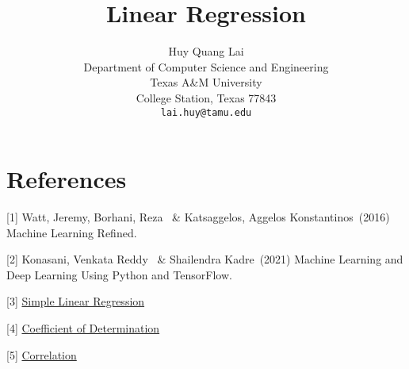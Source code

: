 \documentclass{article}
\title{Linear Regression}
\author{
    Huy Quang Lai \\
    Department of Computer Science and Engineering\\
    Texas A\&M University\\
    College Station, Texas 77843 \\
    \texttt{lai.huy@tamu.edu} \\
}
\begin{document}
\maketitle




\clearpage







\section*{References}
{
\small
[1] Watt, Jeremy, Borhani, Reza \ \& Katsaggelos, Aggelos Konstantinos\ (2016) Machine Learning Refined.

[2] Konasani, Venkata Reddy \ \& Shailendra Kadre\ (2021) Machine Learning and Deep Learning Using Python and TensorFlow.

[3] \href{https://en.wikipedia.org/wiki/Simple_linear_regression}{Simple Linear Regression}

[4] \href{https://en.wikipedia.org/wiki/Coefficient_of_determination}{Coefficient of Determination}

[5] \href{https://en.wikipedia.org/wiki/Correlation}{Correlation}
}
\end{document}
